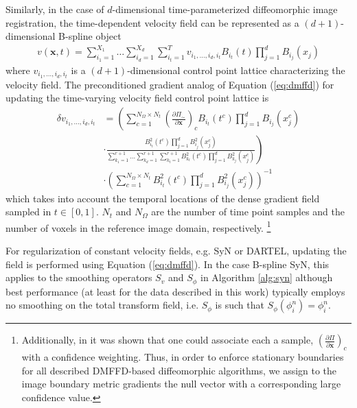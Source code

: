 \documentclass{frontiersSCNS}
\begin{document}
Similarly, in the case of $d$-dimensional time-parameterized 
diffeomorphic image registration, 
the time-dependent velocity field can be represented
as a $(d + 1)$-dimensional B-spline object
\begin{align}
v(\mathbf{x}, t) = \sum_{i_1=1}^{X_1}\ldots\sum_{i_d=1}^{X_d}\sum_{i_t=1}^T v_{i_1,\ldots,i_d,i_t} B_{i_t}(t) \prod_{j=1}^d B_{i_j}(x_j)
\end{align}
where $v_{i_1,\ldots,i_d,i_t}$ is a $(d+1)$-dimensional control point lattice
characterizing the velocity field.  The preconditioned gradient analog of
Equation (\ref{eq:dmffd}) for updating the time-varying velocity field control point lattice is 
\begin{align}
\label{eq:tvdmffd}
  \delta v_{i_1,\ldots,i_d,i_t} &= \left( \sum_{c=1}^{N_{\Omega} \times N_t} \left( \frac{\partial \Pi_\sim}{\partial \mathbf{x}} \right)_c B_{i_t}(t^c)\prod_{j=1}^d B_{i_j}(x_j^c)  \right. \nonumber \\
  &\cdot \left. \frac{B_{i_t}^2(t^c) \prod_{j=1}^d B_{i_j}^2 (x_j^c)}
  {\sum_{k_1=1}^{r+1}\ldots\sum_{k_d=1}^{r+1} \sum_{k_t=1}^{r+1} B_{k_t}^2(t^c)
  \prod_{j=1}^d B_{k_j}^2 (x_j^c)} \right) \nonumber \\
  &\cdot\left({\sum_{c=1}^{N_{\Omega}\times N_t}B_{i_t}^2(t^c) \prod_{j=1}^d B_{i_j}^2 (x_j^c)} \right) ^{-1}
\end{align}
which takes into account the temporal locations of the
dense gradient field sampled in $t \in [0,1]$. $N_t$ and $N_\Omega$ are the number
of time point samples and the number of voxels in the reference image domain, respectively.
\footnote{
Additionally, in \cite{tustison2006} it was shown that one could associate each
a sample, $\left( \frac{\partial \Pi}{\partial \mathbf{x}}\right)_c$ with a confidence
weighting.  Thus, in order to enforce stationary boundaries for all described
DMFFD-based diffeomorphic algorithms, we
assign to the image boundary metric gradients the null vector with a corresponding
large confidence value.
}

For regularization of constant velocity fields, e.g. SyN or DARTEL, updating the 
field is performed using Equation (\ref{eq:dmffd}).  In the case B-spline SyN, 
this applies to the smoothing operators $S_{v}$ and $S_{\phi}$ in Algorithm \ref{alg:syn}
although best performance (at least for the data described in this work) typically
employs no smoothing on the total transform field, i.e. $S_\phi$ is such that $S_\phi( \phi_i^n ) = \phi_i^n$.
\end{document}
